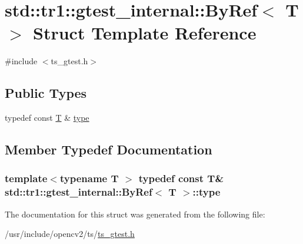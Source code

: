 \hypertarget{structstd_1_1tr1_1_1gtest__internal_1_1ByRef}{\section{std\-:\-:tr1\-:\-:gtest\-\_\-internal\-:\-:By\-Ref$<$ T $>$ Struct Template Reference}
\label{structstd_1_1tr1_1_1gtest__internal_1_1ByRef}
}


{\ttfamily \#include $<$ts\-\_\-gtest.\-h$>$}

\subsection*{Public Types}
\begin{DoxyCompactItemize}
\item 
typedef const \hyperlink{calib3d_8hpp_a3efb9551a871ddd0463079a808916717}{T} \& \hyperlink{structstd_1_1tr1_1_1gtest__internal_1_1ByRef_ac42ad942ee1cfa86b2abcce9b88ac10e}{type}
\end{DoxyCompactItemize}


\subsection{Member Typedef Documentation}
\hypertarget{structstd_1_1tr1_1_1gtest__internal_1_1ByRef_ac42ad942ee1cfa86b2abcce9b88ac10e}{
\subsubsection[{type}]{\setlength{\rightskip}{0pt plus 5cm}template$<$typename T $>$ typedef const {\bf T}\& {\bf std\-::tr1\-::gtest\-\_\-internal\-::\-By\-Ref}$<$ {\bf T} $>$\-::{\bf type}}}\label{structstd_1_1tr1_1_1gtest__internal_1_1ByRef_ac42ad942ee1cfa86b2abcce9b88ac10e}


The documentation for this struct was generated from the following file\-:\begin{DoxyCompactItemize}
\item 
/usr/include/opencv2/ts/\hyperlink{ts__gtest_8h}{ts\-\_\-gtest.\-h}\end{DoxyCompactItemize}

